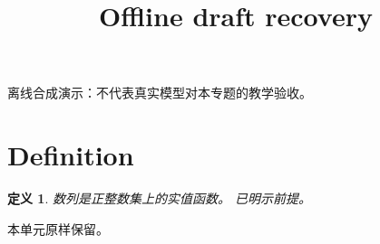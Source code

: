 \documentclass[UTF8,fontset=fandol,11pt]{ctexart}
\title{Offline draft recovery}
\date{}
\newtheorem{definition}{定义}[section]
\begin{document}
\maketitle
\par\noindent 离线合成演示：不代表真实模型对本专题的教学验收。\par
\section{Definition}\label{sec:S01}
\begin{definition}
数列是正整数集上的实值函数。 已明示前提。
\end{definition}
本单元原样保留。\par
\end{document}

